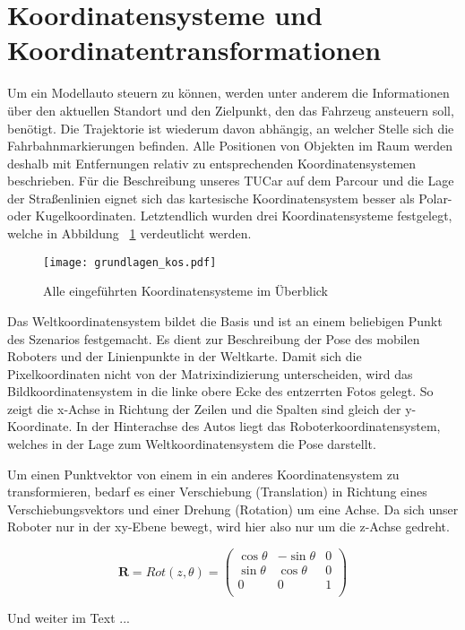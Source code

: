 \section{Koordinatensysteme und Koordinatentransformationen}

Um ein Modellauto steuern zu können, werden unter anderem die Informationen über den aktuellen Standort und den Zielpunkt, den das Fahrzeug ansteuern soll, benötigt. Die Trajektorie ist wiederum davon abhängig, an welcher Stelle sich die Fahrbahnmarkierungen befinden. Alle Positionen von Objekten im Raum werden deshalb mit Entfernungen relativ zu entsprechenden Koordinatensystemen beschrieben. Für die Beschreibung unseres TUCar auf dem Parcour und die Lage der Straßenlinien eignet sich das kartesische Koordinatensystem besser als Polar- oder Kugelkoordinaten. Letztendlich wurden drei Koordinatensysteme festgelegt, welche in Abbildung ~\ref{fig:grundlagen_kos} verdeutlicht werden. 

\begin{figure}[H] %
  \centering
  \texttt{[image: grundlagen\_kos.pdf]}
  \caption{Alle eingeführten Koordinatensysteme im Überblick}
  \label{fig:grundlagen_kos}
\end{figure}

Das Weltkoordinatensystem bildet die Basis und ist an einem beliebigen Punkt des Szenarios festgemacht. Es dient zur Beschreibung der Pose des mobilen Roboters und der Linienpunkte in der Weltkarte. Damit sich die Pixelkoordinaten nicht von der Matrixindizierung unterscheiden, wird das Bildkoordinatensystem in die linke obere Ecke des entzerrten Fotos gelegt. So zeigt die x-Achse in Richtung der Zeilen und die Spalten sind gleich der y-Koordinate. In der Hinterachse des Autos liegt das Roboterkoordinatensystem, welches in der Lage zum Weltkoordinatensystem die Pose darstellt.

Um einen Punktvektor von einem in ein anderes Koordinatensystem zu transformieren, bedarf es einer Verschiebung (Translation) in Richtung eines Verschiebungsvektors und einer Drehung (Rotation) um eine Achse. Da sich unser Roboter nur in der xy-Ebene bewegt, wird hier also nur um die z-Achse gedreht.  

\begin{equation}
\mathbf{R} = Rot(z,\theta) = 
\begin{pmatrix}
\cos{\theta} & -\sin{\theta} & {0} 	\\
\sin{\theta} & \cos{\theta} & {0} 	\\
{0} & {0} & {1} 				    	\\
\end{pmatrix}
\end{equation}

Und weiter im Text ...
